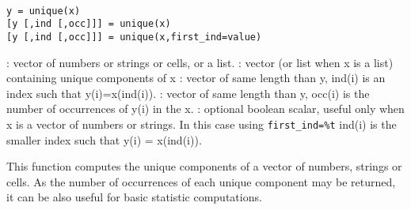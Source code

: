 
\begin{mandesc}
   \\
\end{mandesc}

\begin{calling_sequence}
\begin{verbatim}
y = unique(x)
[y [,ind [,occ]]] = unique(x)
[y [,ind [,occ]]] = unique(x,first_ind=value)
\end{verbatim}
\end{calling_sequence}
\begin{parameters}
  \begin{varlist}
     : vector of numbers or strings or cells, or a list.
     : vector (or list when x is a list) containing unique components of x
     : vector of same length than y, ind(i) is an index
                  such that y(i)=x(ind(i)).
     : vector of same length than y, occ(i) is the number
                  of occurrences of y(i) in the x.
     : optional boolean scalar, useful only when x is a vector
    of numbers or strings. In this case using \verb!first_ind=%t! ind(i) is
    the smaller index such that y(i) = x(ind(i)).
  \end{varlist}
\end{parameters}

\begin{mandescription}
  This function computes the unique components of a vector of numbers,
  strings or cells. As the number of occurrences of each unique
  component may be returned, it can be also useful for basic statistic
  computations.
\end{mandescription}

